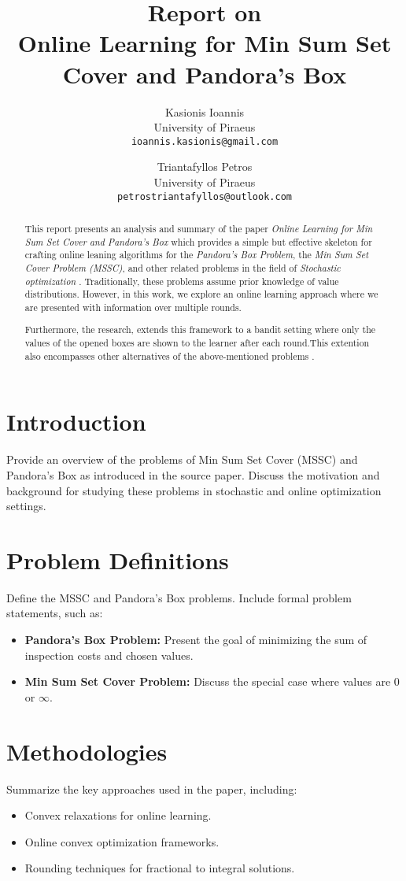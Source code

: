 \documentclass[11pt,a4paper]{article}
\title{Report on \\ \textbf{Online Learning for Min Sum Set Cover and Pandora's Box}}
\author{
    Kasionis Ioannis \\ University of Piraeus \\ \texttt{ioannis.kasionis@gmail.com}
    \and
    Triantafyllos Petros \\ University of Piraeus \\ \texttt{petrostriantafyllos@outlook.com}
}
\date{}
\begin{document}
\maketitle

\begin{abstract}
This report presents an analysis and summary of the paper \textit{Online Learning for Min Sum Set Cover and Pandora's Box} which provides a simple but effective skeleton for crafting online leaning algorithms for the \textit{Pandora's Box Problem}, the \textit{Min Sum Set Cover Problem (MSSC)}, and other related problems in the field of \textit{Stochastic optimization} \cite{gergatsouli2022online}. Traditionally, these problems assume prior knowledge of value distributions. However, in this work, we explore an online learning approach where we are presented with information over multiple rounds. \par 
Furthermore, the research, extends this framework to a bandit setting where only the values of the opened boxes are shown to the learner after each round.This extention also encompasses other alternatives of the above-mentioned problems \cite{gergatsouli2022online}.
\end{abstract}

\section{Introduction}
Provide an overview of the problems of Min Sum Set Cover (MSSC) and Pandora's Box as introduced in the source paper. Discuss the motivation and background for studying these problems in stochastic and online optimization settings.

\section{Problem Definitions}
Define the MSSC and Pandora's Box problems. Include formal problem statements, such as:
\begin{itemize}
    \item \textbf{Pandora's Box Problem:} Present the goal of minimizing the sum of inspection costs and chosen values.
    \item \textbf{Min Sum Set Cover Problem:} Discuss the special case where values are 0 or $\infty$.
\end{itemize}

\section{Methodologies}
Summarize the key approaches used in the paper, including:
\begin{itemize}
    \item Convex relaxations for online learning.
    \item Online convex optimization frameworks.
    \item Rounding techniques for fractional to integral solutions.
\end{itemize}
\end{document}
